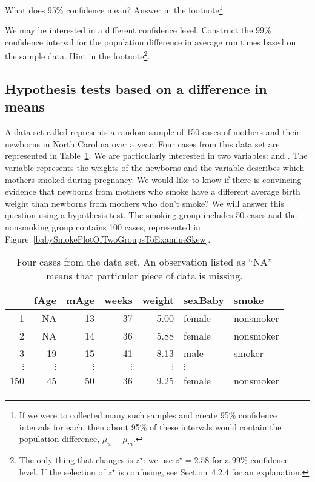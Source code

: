\begin{exercise}
What does 95\% confidence mean? Answer in the footnote\footnote{If we were to collected many such samples and create 95\% confidence intervals for each, then about 95\% of these intervals would contain the population difference, $\mu_w - \mu_m$.}.
\end{exercise}

\begin{exercise}
We may be interested in a different confidence level. Construct the 99\% confidence interval for the population difference in average run times based on the sample data. Hint in the footnote\footnote{The only thing that changes is $z^{\star}$: we use $z^{\star}=2.58$ for a 99\% confidence level. If the selection of $z^{\star}$ is confusing, see Section~4.2.4 for an explanation.}.
\end{exercise}

\subsection{Hypothesis tests based on a difference in means}

A data set called  represents a random sample of 150 cases of mothers and their newborns in North Carolina over a year. Four cases from this data set are represented in Table~\ref{babySmokeDF}. We are particularly interested in two variables:  and . The  variable represents the weights of the newborns and the  variable describes which mothers smoked during pregnancy. We would like to know if there is convincing evidence that newborns from mothers who smoke have a different average birth weight than newborns from mothers who don't smoke? We will answer this question using a hypothesis test. The smoking group includes 50 cases and the nonsmoking group contains 100 cases, represented in Figure~\ref{babySmokePlotOfTwoGroupsToExamineSkew}.

\begin{table}[h]
\centering
\begin{tabular}{rrrrrll}
  \hline
 & fAge & mAge & weeks & weight & sexBaby & smoke \\ 
  \hline
1 & NA & 13 &  37 & 5.00 & female & nonsmoker \\ 
  2 & NA & 14 &  36 & 5.88 & female & nonsmoker \\ 
  3 & 19 & 15 &  41 & 8.13 & male & smoker \\ 
  $\vdots$ &   $\vdots$ &   $\vdots$ &   $\vdots$ &   $\vdots$ &   $\vdots$ \\
  150 & 45 & 50 &  36 & 9.25 & female & nonsmoker \\ 
   \hline
\end{tabular}
\caption{Four cases from the  data set. An observation listed as ``NA'' means that particular piece of data is missing.}
\label{babySmokeDF}
\end{table}

